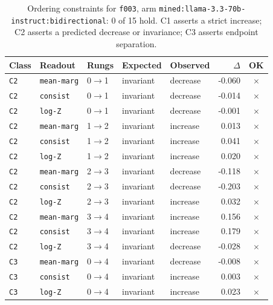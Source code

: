 \documentclass[11pt]{article}
\begin{document}
\begin{table}[htbp]
\centering
\small
\caption{Ordering constraints for \texttt{f003}, arm \texttt{mined:llama-3.3-70b-instruct:bidirectional}: 0 of 15 hold. C1 asserts a strict increase; C2 asserts a predicted decrease or invariance; C3 asserts endpoint separation.}
\label{tab:ladder-f003-mined-llama-3-3-70b-instruct-bidirectional}
\begin{tabular}{lllllrc}
\toprule
Class & Readout & Rungs & Expected & Observed & $\Delta$ & OK \\
\midrule
\texttt{C2} & \texttt{mean-marg} & 0$\to$1 & invariant & decrease & -0.060 & $\times$ \\
\texttt{C2} & \texttt{consist} & 0$\to$1 & invariant & decrease & -0.014 & $\times$ \\
\texttt{C2} & \texttt{log-Z} & 0$\to$1 & invariant & decrease & -0.001 & $\times$ \\
\texttt{C2} & \texttt{mean-marg} & 1$\to$2 & invariant & increase & 0.013 & $\times$ \\
\texttt{C2} & \texttt{consist} & 1$\to$2 & invariant & increase & 0.041 & $\times$ \\
\texttt{C2} & \texttt{log-Z} & 1$\to$2 & invariant & increase & 0.020 & $\times$ \\
\texttt{C2} & \texttt{mean-marg} & 2$\to$3 & invariant & decrease & -0.118 & $\times$ \\
\texttt{C2} & \texttt{consist} & 2$\to$3 & invariant & decrease & -0.203 & $\times$ \\
\texttt{C2} & \texttt{log-Z} & 2$\to$3 & invariant & increase & 0.032 & $\times$ \\
\texttt{C2} & \texttt{mean-marg} & 3$\to$4 & invariant & increase & 0.156 & $\times$ \\
\texttt{C2} & \texttt{consist} & 3$\to$4 & invariant & increase & 0.179 & $\times$ \\
\texttt{C2} & \texttt{log-Z} & 3$\to$4 & invariant & decrease & -0.028 & $\times$ \\
\texttt{C3} & \texttt{mean-marg} & 0$\to$4 & invariant & decrease & -0.008 & $\times$ \\
\texttt{C3} & \texttt{consist} & 0$\to$4 & invariant & increase & 0.003 & $\times$ \\
\texttt{C3} & \texttt{log-Z} & 0$\to$4 & invariant & increase & 0.023 & $\times$ \\
\bottomrule
\end{tabular}
\end{table}
\end{document}
